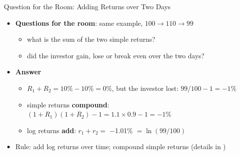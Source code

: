\begin{frame}{Question for the Room: Adding Returns over Two Days}
\itemsize{\footnotesize}
\begin{itemize}
    \item \textbf{Questions for the room}: same example, $100 \to 110 \to 99$
    \begin{itemize}
        \item what is the sum of the two simple returns?
        \item did the investor gain, lose or break even over the two days?
    \end{itemize}
    \pause
    \item \textbf{Answer}
    \begin{itemize}
        \item $R_1 + R_2 = 10\% - 10\% = 0\%$, but the investor lost: $99/100 - 1 = -1\%$
        \item simple returns \textbf{compound}: $(1 + R_1)(1 + R_2) - 1 = 1.1 \times 0.9 - 1 = -1\%$
        \item log returns \textbf{add}: $r_1 + r_2 = $ \ensuremath{-}1.01\% $= \ln(99/100)$
    \end{itemize}
    \item Rule: add log returns over time; compound simple returns (details in )
\end{itemize}
\end{frame}

